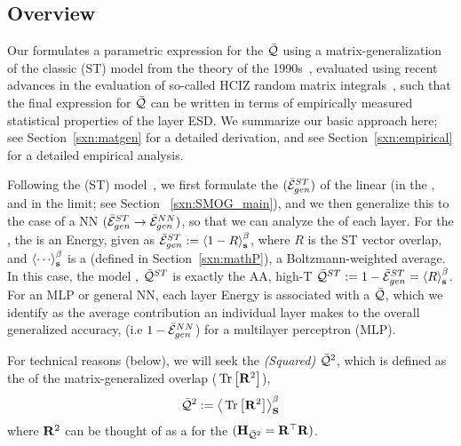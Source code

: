 \subsection{\SETOL Overview}
\label{sxn:setol_overview}


Our \SETOL formulates a parametric expression for the \LayerQuality $\bar{\mathcal{Q}}$ using a matrix-generalization of the classic \StudentTeacher (ST)
model from the \SMOG theory of the 1990s~\cite{SST92,STS90}, evaluated using
recent advances in the evaluation of so-called HCIZ random matrix integrals~\cite{potters_bouchaud_2020,Tanaka2007, Tanaka2008},
such that the final expression for $\bar{\mathcal{Q}}$ can be written in terms of empirically measured statistical properties of the layer ESD.
We summarize our basic approach here; see Section~\ref{sxn:matgen} for a detailed derivation, and see Section~\ref{sxn:empirical} for a detailed empirical analysis.

Following the \StudentTeacher (ST) model~\cite{SST92}, 
we first formulate the \GeneralizationError $(\bar{\mathcal{E}}^{ST}_{gen})$ of the linear \Perceptron (in the \emph{\AnnealedApproximation},
and in the \emph{\HighTemperature} limit; see Section ~\ref{sxn:SMOG_main}), and 
we then generalize this to the case of a NN $(\bar{\mathcal{E}}^{ST}_{gen}\rightarrow\bar{\mathcal{E}}^{NN}_{gen})$, so that we can analyze the \Quality of each layer.
For the \Perceptron, the \GeneralizationError is an Energy, given as $\bar{\mathcal{E}}^{ST}_{gen}:=\left\langle 1-R \right\rangle_{\mathbf s}^{\beta}$, where $R$ is the ST vector overlap,
and $\THRMAVG{\cdots}$ is a \emph{\ThermalAverage} (defined in Section~\ref{sxn:mathP}),
a Boltzmann-weighted average.
In this case, the model \Quality, $\bar{\mathcal{Q}}^{ST}$ is exactly the AA, high-T \AverageGeneralizationAccuracy 
{}
$\bar{\mathcal{Q}}^{ST}:=1-\bar{\mathcal{E}}^{ST}_{gen}=\left\langle R \right\rangle_{\mathbf s}^{\beta}$.
For an MLP or general NN, each layer Energy is associated with a
\LayerQuality $\bar{\mathcal{Q}}$, which we identify as the average contribution an
individual layer makes to the overall generalized accuracy,
(i.e $1-\bar{\mathcal{E}}^{NN}_{gen}$) for a multilayer perceptron (MLP).

For technical reasons (below), we will seek the
\emph{\LayerQuality (Squared)} $\bar{\mathcal{Q}}^{2}$, which is defined as the \ThermalAverage
of the matrix-generalized overlap ($\mbox{}\operatorname{Tr}\left[\mathbf{R}^{2}\right]$),
\begin{align}
  \label{eqn:QT}
  \bar{\mathcal{Q}}^{2} :=   \left\langle \mbox{}\operatorname{Tr}\left[\mathbf{R}^{2}\right] \right\rangle_{\mathbf S}^{\beta}
\end{align}
where $\mathbf{R}^{2}$ can be thought of as a \Hamiltonian for the \QualitySquared  $(\mathbf{H}_{\bar{\mathcal{Q}}^{2}}=\mathbf{R}^{\top}\mathbf{R})$.

